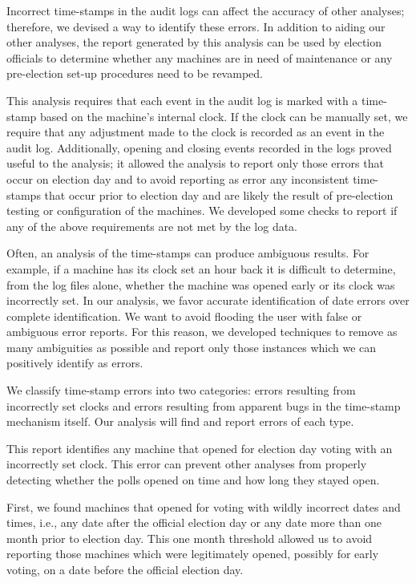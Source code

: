 \label{an:date} 
\smvertspace
Incorrect time-stamps in the audit logs can affect the accuracy of other
analyses; therefore, we devised a way to identify these errors.
In addition to aiding our other analyses, the report generated by this analysis
can be used by election officials to determine whether any machines 
are in need of maintenance or any pre-election set-up procedures need to be
revamped.

This analysis requires that each event in the audit log
is marked with a time-stamp based on the machine's internal clock. If
the clock can be manually set, we require that any adjustment made to
the clock is recorded as an event in the
audit log. Additionally, opening and closing events recorded in the logs proved
useful to the analysis; it allowed the analysis to report only those
errors that occur on election day and to avoid reporting as error
any inconsistent time-stamps that occur prior to election day and are
likely the result of pre-election testing or configuration of the
machines. We developed some checks to report if any of
the above requirements are not met by the log data.

Often, an analysis of the time-stamps can produce ambiguous
results. For example, if a machine has its clock set an hour back it
is difficult to determine, from the log files alone, whether the machine
was opened early or its clock was incorrectly set. In our analysis, we
favor accurate identification of date errors over complete
identification. We want to avoid flooding the user with false or
ambiguous error reports. For this reason, we developed techniques to
remove as many ambiguities as possible and report only those
instances which we can positively identify as errors.

We classify time-stamp errors into two categories: errors
resulting from incorrectly set clocks and errors resulting from apparent bugs in
the time-stamp mechanism itself. Our analysis will
find and report errors of each type.

This report identifies any machine that opened for election day voting
with an incorrectly set clock. This error can prevent other analyses
from properly detecting whether the polls opened on time and how long they
stayed open.

First, we found machines that opened for voting with wildly incorrect
dates and times, i.e., any date after the official election
day or any date more than one month prior to election day. This one
month threshold allowed us to avoid reporting those machines which
were legitimately opened, possibly for early voting, on a date before
the official election day. 

